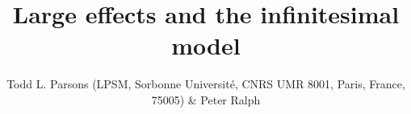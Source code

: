 \documentclass{article}
\newcommand{\1}{\mathbbm{1}}
\theoremstyle{remark}
\theoremstyle{definition}
\begin{document}
% 
% 
% 
% 
% 


\title{\large{\bf
    Large effects and the infinitesimal model
}}

\author{ \begin{small}
    Todd L. Parsons (LPSM, Sorbonne Universit\'e, CNRS UMR 8001, Paris, France, 75005) \&
    Peter Ralph
\end{small}}
\end{document}
